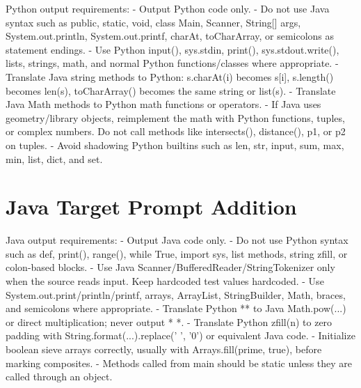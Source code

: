 \begin{promptbox}
Python output requirements:
- Output Python code only.
- Do not use Java syntax such as public, static, void, class Main, Scanner, String[] args, System.out.println, System.out.printf, charAt, toCharArray, or semicolons as statement endings.
- Use Python input(), sys.stdin, print(), sys.stdout.write(), lists, strings, math, and normal Python functions/classes where appropriate.
- Translate Java string methods to Python: s.charAt(i) becomes s[i], s.length() becomes len(s), toCharArray() becomes the same string or list(s).
- Translate Java Math methods to Python math functions or operators.
- If Java uses geometry/library objects, reimplement the math with Python functions, tuples, or complex numbers. Do not call methods like intersects(), distance(), p1, or p2 on tuples.
- Avoid shadowing Python builtins such as len, str, input, sum, max, min, list, dict, and set.
\end{promptbox}

\section{Java Target Prompt Addition}

\begin{promptbox}
Java output requirements:
- Output Java code only.
- Do not use Python syntax such as def, print(), range(), while True, import sys, list methods, string zfill, or colon-based blocks.
- Use Java Scanner/BufferedReader/StringTokenizer only when the source reads input. Keep hardcoded test values hardcoded.
- Use System.out.print/println/printf, arrays, ArrayList, StringBuilder, Math, braces, and semicolons where appropriate.
- Translate Python ** to Java Math.pow(...) or direct multiplication; never output * *.
- Translate Python zfill(n) to zero padding with String.format(...).replace(' ', '0') or equivalent Java code.
- Initialize boolean sieve arrays correctly, usually with Arrays.fill(prime, true), before marking composites.
- Methods called from main should be static unless they are called through an object.
\end{promptbox}
